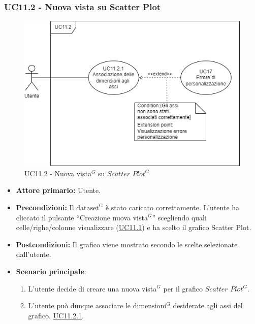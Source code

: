 
\subsubsection{UC11.2 - Nuova vista su Scatter Plot}
\label{sec:UC11.2}
\begin{figure}[H]
	\centering
	\includegraphics[scale=0.60]{../../assets/creazionevista_scatter_plot.png}
	\caption{UC11.2 - Nuova vista$^{G}$ su $Scatter$ $Plot^{G}$}
\end{figure}
\begin{itemize}
    \item \textbf{Attore primario:} Utente.
    \item \textbf{Precondizioni:} Il ${\mathrm{dataset^{G}}}$ è stato caricato correttamente. L'utente ha cliccato il pulsante ``Creazione nuova vista$^{G}$'' scegliendo quali celle/righe/colonne visualizzare (\hyperref[sec:UC11.1]{UC11.1}) e ha scelto il grafico Scatter Plot.
    \item \textbf{Postcondizioni:} Il grafico viene mostrato secondo le scelte selezionate dall'utente.
    \item \textbf{Scenario principale}:
    \begin{enumerate}
		\item L'utente decide di creare una nuova vista$^{G}$ per il grafico $Scatter$ $Plot^{G}$.
		\item L'utente può dunque associare le ${\mathrm{dimensioni^{G}}}$ desiderate agli assi del grafico. \hyperref[sec:UC11.2.1]{UC11.2.1}.
	\end{enumerate}
\end{itemize}

